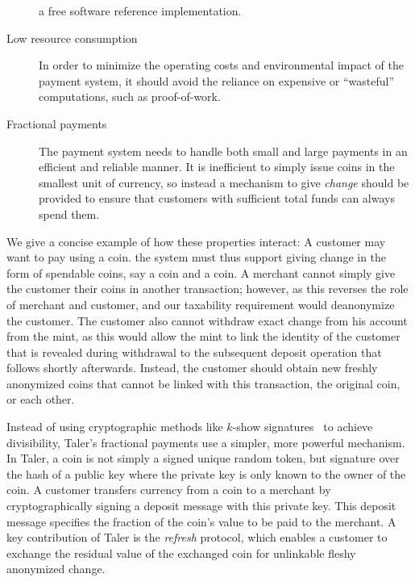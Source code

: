 \documentclass{llncs}
\begin{document}
\begin{description}
    a free software reference implementation.
  \item[Low resource consumption]
    In order to minimize the operating costs and environmental impact of
    the payment system, it should avoid the reliance on expensive or
    ``wasteful'' computations, such as proof-of-work.
  \item[Fractional payments]
    The payment system needs to handle both small and large payments in
    an efficient and reliable manner.  It is inefficient to simply issue
    coins in the smallest unit of currency, so instead a mechanism to
    give {\em change} should be provided to ensure that customers with
    sufficient total funds can always spend them.
\end{description}
%
We give a concise example of how these properties interact:
A customer may want to pay  using a  coin.
the system must thus support giving change in the form of spendable coins,
say a  coin and a  coin.
A merchant cannot simply give the customer their coins in another transaction;
however, as this reverses the role of merchant and customer, and
our taxability requirement would deanonymize the customer.  The customer
also cannot withdraw exact change from his account from the mint, as this
would allow the mint to link the identity of the customer that is revealed
during withdrawal to the subsequent deposit operation that follows shortly
afterwards.
Instead, the customer should obtain new freshly anonymized coins that cannot be
linked with this transaction, the original  coin, or each other.

Instead of using cryptographic methods like $k$-show
signatures~\cite{brands1993efficient} to achieve divisibility,
Taler's fractional payments use a simpler, more powerful mechanism.
In Taler, a coin is not simply a signed unique random token, but signature
over the hash of a public key where the private key is only known to the owner
of the coin.
A customer transfers currency from a coin to a merchant by cryptographically
signing a deposit message with this private key.  This deposit message
specifies the fraction of the coin's value to be paid to the merchant.
A key contribution of Taler is the {\em refresh} protocol, which enables
a customer to exchange the residual value of the exchanged coin for
unlinkable fleshy anonymized change.
\end{document}
